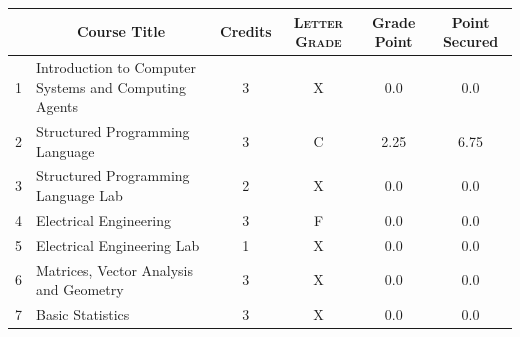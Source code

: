 \documentclass[11pt]{article}
\newcommand*{\numtwo}[1]{\pgfmathprintnumber[
                    fixed, precision=2, fixed zerofill=true]{#1}}
\begin{document}
                \begin{center}
                    \renewcommand{\arraystretch}{1.08}
                    
                \begin{tabular}{|c|l|c|>{\scshape}c|c|c|}
                \hline  \rule[-1ex]{0pt}{3.5ex} {\centering{\bf Course Code}} &  \multicolumn{1}{c|}{\textbf{Course Title}}  & {\bf Credits} & {\bf Letter Grade} & {\bf Grade Point} & {\bf Point Secured}  \\ 
                \hline   1 &  Introduction to Computer Systems and Computing Agents		 & 3 & X & 0.0 & 0.0 \\ %
                \hline   2 &  Structured Programming Language		 & 3 & C & 2.25 & 6.75 \\ %
                \hline   3 &  Structured Programming Language Lab		 & 2 & X & 0.0 & 0.0 \\ %
                \hline   4 &  Electrical Engineering		 & 3 & F & 0.0 & 0.0 \\ %
                \hline   5 &  Electrical Engineering Lab		 & 1 & X & 0.0 & 0.0 \\ %
                \hline   6 &  Matrices, Vector Analysis and Geometry		 & 3 & X & 0.0 & 0.0 \\ %
                \hline   7 &  Basic Statistics		 & 3 & X & 0.0 & 0.0 \\ %

\hline                %
                \end{tabular}
                \end{center}
                \renewcommand{\arraystretch}{1.03}
\end{document}
